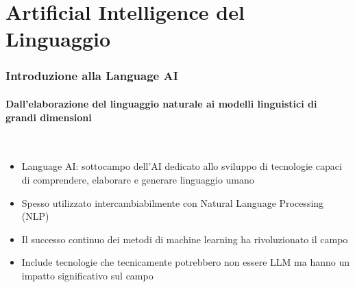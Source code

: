 \section{Artificial Intelligence del Linguaggio} %
\label{sec:language_ai}
%
\begin{frame}[t,fragile] \frametitle{Introduzione alla Language AI}
	{\scriptsize
		\onslide<1->
            \framesubtitle{Dall'elaborazione del linguaggio naturale ai modelli linguistici di grandi dimensioni}
            \vspace*{-15pt}
             \begin{minipage}[t]{\textwidth}
            \end{minipage}
            \\\vspace*{3pt}
	    	\begin{minipage}[t]{\textwidth}
				\begin{minipage}[t]{0.6\textwidth}
	    			\begin{itemize}[leftmargin=10pt,align=right]
						\onslide<2->\item[\alert{\faHandORight}] \alert{Language AI:} sottocampo dell'AI dedicato allo sviluppo di tecnologie capaci di \alert{comprendere, elaborare e generare} linguaggio umano
						\onslide<3->\item[\alert{\faHandORight}] Spesso utilizzato \alert{intercambiabilmente} con Natural Language Processing (NLP)
						\onslide<4->\item[\alert{\faHandORight}] Il successo continuo dei metodi di \alert{machine learning} ha rivoluzionato il campo
						\onslide<5->\item[\alert{\faHandORight}] Include tecnologie che tecnicamente potrebbero non essere LLM ma hanno un \alert{impatto significativo} sul campo
					\end{itemize}
            	\end{minipage}
            	\begin{minipage}[t]{0.4\textwidth}
            	\end{minipage}
	    	\end{minipage}
	}
\end{frame}
